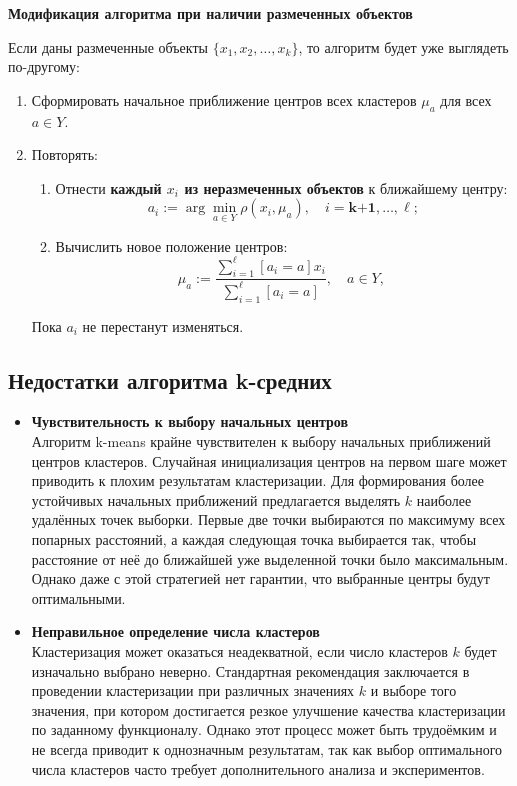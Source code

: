 \textbf{Модификация алгоритма 
при наличии размеченных объектов}

Если даны размеченные объекты $\{x_1, x_2, \ldots, x_k\}$, то алгоритм будет уже выглядеть по-другому:

\begin{enumerate}
    \item Сформировать начальное приближение центров всех кластеров  $\mu_a$ для всех ${a \in Y}$.
    \item Повторять:
    \begin{enumerate}
        \item Отнести \textbf{каждый $x_{i}$ из неразмеченных объектов} к ближайшему центру:  
        \[
        a_i := \arg \min_{a \in Y} \rho(x_i, \mu_a), \quad i = \textbf{k+1}, \ldots, \ell;
        \]
        \item Вычислить новое положение центров:  
        \[
        \mu_{a} := \frac{\sum_{i=1}^\ell [a_i = a] x_i}{\sum_{i=1}^\ell [a_i = a]}, 
        \quad a \in Y, \; 
        \]
    \end{enumerate}
    Пока $a_i$ не перестанут изменяться.
\end{enumerate}

\subsection{Недостатки алгоритма k-средних}
\begin{itemize}
    \item \textbf{Чувствительность к выбору начальных центров} \\
    Алгоритм k-means крайне чувствителен к выбору начальных приближений центров кластеров. Случайная инициализация центров на первом шаге может приводить к плохим результатам кластеризации. Для формирования более устойчивых начальных приближений предлагается выделять \( k \) наиболее удалённых точек выборки. Первые две точки выбираются по максимуму всех попарных расстояний, а каждая следующая точка выбирается так, чтобы расстояние от неё до ближайшей уже выделенной точки было максимальным. Однако даже с этой стратегией нет гарантии, что выбранные центры будут оптимальными.
    \item \textbf{Неправильное определение числа кластеров} \\
    Кластеризация может оказаться неадекватной, если число кластеров \( k \) будет изначально выбрано неверно. Стандартная рекомендация заключается в проведении кластеризации при различных значениях \( k \) и выборе того значения, при котором достигается резкое улучшение качества кластеризации по заданному функционалу. Однако этот процесс может быть трудоёмким и не всегда приводит к однозначным результатам, так как выбор оптимального числа кластеров часто требует дополнительного анализа и экспериментов.
\end{itemize}

